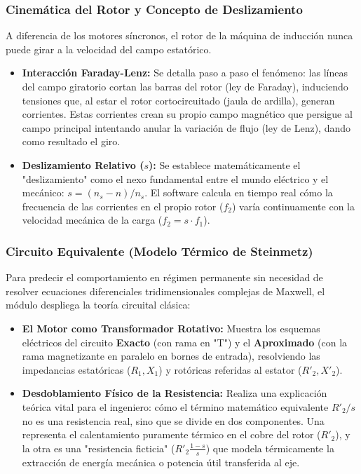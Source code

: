 \documentclass[11pt,a4paper]{article}
\begin{document}
\subsubsection{Cinemática del Rotor y Concepto de Deslizamiento}
A diferencia de los motores síncronos, el rotor de la máquina de inducción nunca puede girar a la velocidad del campo estatórico.
\begin{itemize}
    \item \textbf{Interacción Faraday-Lenz:} Se detalla paso a paso el fenómeno: las líneas del campo giratorio cortan las barras del rotor (ley de Faraday), induciendo tensiones que, al estar el rotor cortocircuitado (jaula de ardilla), generan corrientes. Estas corrientes crean su propio campo magnético que persigue al campo principal intentando anular la variación de flujo (ley de Lenz), dando como resultado el giro.
    \item \textbf{Deslizamiento Relativo ($s$):} Se establece matemáticamente el "deslizamiento" como el nexo fundamental entre el mundo eléctrico y el mecánico: $s = (n_s - n)/n_s$. El software calcula en tiempo real cómo la frecuencia de las corrientes en el propio rotor ($f_2$) varía continuamente con la velocidad mecánica de la carga ($f_2 = s \cdot f_1$).
\end{itemize}

\subsubsection{Circuito Equivalente (Modelo Térmico de Steinmetz)}
Para predecir el comportamiento en régimen permanente sin necesidad de resolver ecuaciones diferenciales tridimensionales complejas de Maxwell, el módulo despliega la teoría circuital clásica:
\begin{itemize}
    \item \textbf{El Motor como Transformador Rotativo:} Muestra los esquemas eléctricos del circuito \textbf{Exacto} (con rama en "T") y el \textbf{Aproximado} (con la rama magnetizante en paralelo en bornes de entrada), resolviendo las impedancias estatóricas ($R_1, X_1$) y rotóricas referidas al estator ($R'_2, X'_2$).
    \item \textbf{Desdoblamiento Físico de la Resistencia:} Realiza una explicación teórica vital para el ingeniero: cómo el término matemático equivalente $R'_2/s$ no es una resistencia real, sino que se divide en dos componentes. Una representa el calentamiento puramente térmico en el cobre del rotor ($R'_2$), y la otra es una "resistencia ficticia" ($R'_2 \frac{1-s}{s}$) que modela térmicamente la extracción de energía mecánica o potencia útil transferida al eje.
\end{itemize}
\end{document}

